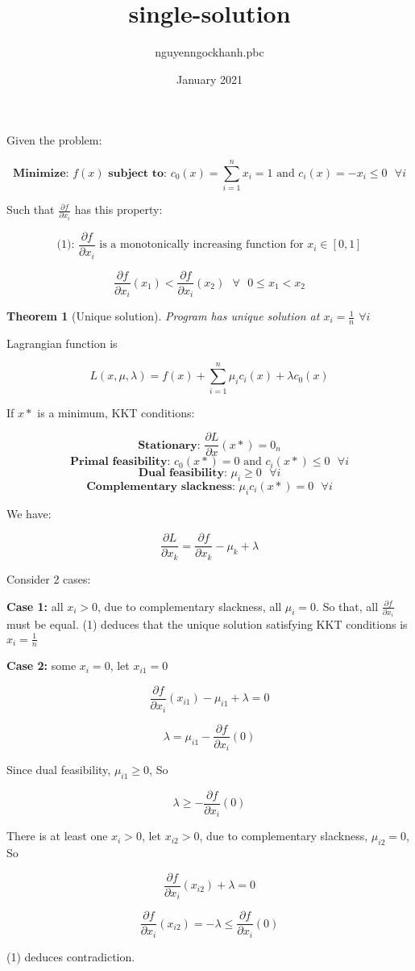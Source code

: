 \documentclass{article}
\title{single-solution}
\author{nguyenngockhanh.pbc }
\date{January 2021}
\newtheorem{theorem}{Theorem}
\begin{document}
Given the problem:

\[
\textbf{Minimize: } f(x)
\textbf{ subject to: } c_0(x) = \sum_{i=1}^{n} x_i = 1 \text{ and } c_i(x) = -x_i \leq 0 \text{ } \forall i
\]


Such that $\frac{\partial f}{\partial x_i}$ has this property:

\[
\text{(1): } \text{$\frac{\partial f}{\partial x_i}$ is a monotonically increasing function for $x_i \in [0, 1]$}
\]

\[
\frac{\partial f}{\partial x_i}(x_1) < \frac{\partial f}{\partial x_i}(x_2) \text{ } \forall \text{ } 0 \leq x_1 < x_2
\]

\begin{theorem}[Unique solution]
\label{theo:unique}
Program has unique solution at $x_i = \frac{1}{n}$ $\forall i$
\end{theorem}

Lagrangian function is

\[
L(x, \mu, \lambda) = f(x) + \sum_{i=1}^{n} \mu_i c_i(x) + \lambda c_0(x)
\]

If $x*$ is a minimum, KKT conditions:

\[
\textbf{Stationary: } \frac{\partial L}{\partial x}(x*) = 0_n
\]
\[
\textbf{Primal feasibility: } c_0(x*) = 0 \text{ and } c_i(x*) \leq 0 \text{ } \forall i
\]
\[
\textbf{Dual feasibility: } \mu_i \geq 0 \text{ } \forall i
\]
\[
\textbf{Complementary slackness: } \mu_i c_i(x*) = 0 \text{ } \forall i
\]

We have:

\[
\frac{\partial L}{\partial x_k} = \frac{\partial f}{\partial x_k} - \mu_k + \lambda
\]

Consider 2 cases:

\textbf{Case 1:} all $x_i > 0$, due to complementary slackness, all $\mu_i = 0$. So that, all $\frac{\partial f}{\partial x_i}$ must be equal. (1) deduces that the unique solution satisfying KKT conditions is $x_i = \frac{1}{n}$

\textbf{Case 2:} some $x_i = 0$, let $x_{i1} = 0$

\[
\frac{\partial f}{\partial x_i}(x_{i1}) - \mu_{i1} + \lambda = 0
\]

\[
\lambda = \mu_{i1} - \frac{\partial f}{\partial x_i}(0)
\]

Since dual feasibility, $\mu_{i1} \geq 0$, So

\[
\lambda \geq - \frac{\partial f}{\partial x_i}(0)
\]

There is at least one $x_i > 0$, let $x_{i2} > 0$, due to complementary slackness, $\mu_{i2} = 0$, So

\[
\frac{\partial f}{\partial x_i}(x_{i2}) + \lambda = 0
\]

\[
\frac{\partial f}{\partial x_i}(x_{i2}) = - \lambda \leq \frac{\partial f}{\partial x_i}(0)
\]

(1) deduces contradiction.
\end{document}
